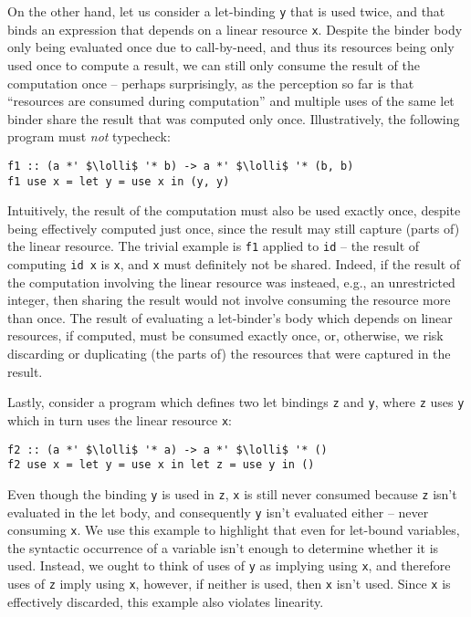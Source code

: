 \documentclass[acmsmall,review,anonymous]{acmart}
\newcommand{\incode}[1]{\lstinline{#1}}
\newcommand{\lolli}{\multimap}
\begin{document}
On the other hand, let us consider a let-binding \lstinline{y} that is used
twice, and that binds an expression that depends on a linear resource
\lstinline{x}.
Despite the binder body only being evaluated once due to call-by-need, and thus
its resources being only used once to compute a result, we can still only
consume the result of the computation once -- perhaps surprisingly, as the
perception so far is that ``resources are consumed during computation'' and
multiple uses of the same let binder share the result that was computed only
once. Illustratively, the following program must \emph{not} typecheck:
%
\begin{noway}
\begin{lstlisting}
f1 :: (a *' $\lolli$ '* b) -> a *' $\lolli$ '* (b, b)
f1 use x = let y = use x in (y, y)
\end{lstlisting}
\end{noway}
%
Intuitively, the result of the computation must also be used exactly once,
despite being effectively computed just once, since the result may
still capture (parts of) the linear resource. The trivial example is \lstinline{f1} applied to
\incode{id} -- the result of computing \incode{id x} is \incode{x}, and \incode{x} must definitely not be
shared. Indeed, if the result of the computation involving the linear resource
was insteaed, e.g., an unrestricted integer, then sharing the result would not
involve consuming the resource more than once.
%
The result of evaluating a let-binder's body which depends on linear resources,
if computed, must be consumed exactly once, or, otherwise, we risk discarding
or duplicating (the parts of) the resources that were captured in the result.

Lastly, consider a program which defines two let bindings \incode{z} and \incode{y}, where
\incode{z} uses \incode{y} which in turn uses the linear resource \incode{x}:
%
\begin{noway}
\begin{lstlisting}
f2 :: (a *' $\lolli$ '* a) -> a *' $\lolli$ '* ()
f2 use x = let y = use x in let z = use y in ()
\end{lstlisting}
\end{noway}
%
Even though the binding \incode{y} is used in \incode{z}, \incode{x} is still never consumed because
\incode{z} isn't evaluated in the let body, and consequently \incode{y} isn't evaluated
either -- never consuming \incode{x}. We use this example to highlight that even for
let-bound variables, the syntactic occurrence of a variable isn't enough to
determine whether it is used. Instead, we ought to think of uses of \incode{y} as
implying using \incode{x}, and therefore uses of \incode{z} imply using \incode{x}, however, if
neither is used, then \incode{x} isn't used. Since \incode{x} is effectively discarded, this
example also violates linearity.
\end{document}
